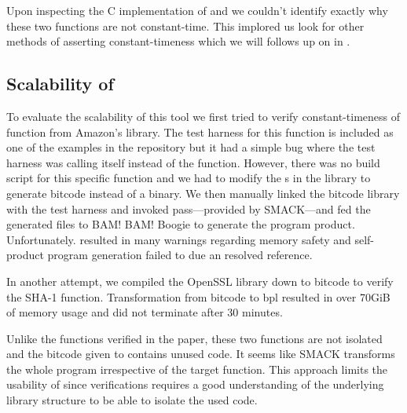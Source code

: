 Upon inspecting the C implementation of  and 
we couldn't identify exactly why these two functions are not constant-time.
This implored us look for other methods of asserting constant-timeness which
we will follows up on in .



\subsection{Scalability of \ctVerif}

To evaluate the scalability of this tool we first tried to verify
constant-timeness of function  from Amazon's
 library. The test harness for this function is included as one of the
examples in the \ctVerif repository but it had a simple bug where the test
harness was calling itself instead of the  function.
However, there was no build script for this specific function and we had to modify the
s in the  library to generate
 bitcode instead of a binary. We then manually linked the bitcode
library with the test harness and invoked  pass---provided by
SMACK---and fed the generated  files to BAM! BAM! Boogie to
generate the program product. Unfortunately.  resulted in
many warnings regarding memory safety and self-product program generation failed
to due an resolved reference.


In another attempt, we compiled the OpenSSL library down to 
bitcode to verify the SHA-1 function. Transformation from bitcode to bpl
resulted in over 70GiB of memory usage and did not terminate after 30 minutes.


Unlike the functions verified in the paper, these two functions are not
isolated and the bitcode given to \ctVerif contains unused code. It seems like
SMACK transforms the whole program irrespective of the target function. This
approach limits the usability of \ctVerif since verifications requires a good
understanding of the underlying library structure to be able to isolate the used
code.

